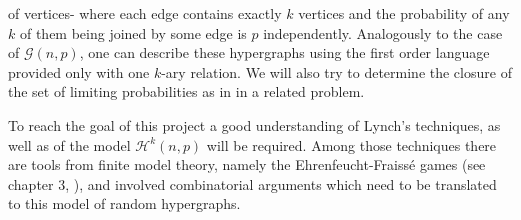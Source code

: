\documentclass{article}
\begin{document}
of vertices- where each edge contains exactly $k$ vertices and the probability of any $k$ of them being joined by some edge is $p$ independently. Analogously to the case of $\mathcal{G}(n,p)$, one can describe these hypergraphs using the first order language provided only with one $k$-ary relation. We will also try to determine the closure of the set of limiting probabilities as in \cite{heinig2018logical} in a related problem.
\par
To reach the goal of this project a good understanding of Lynch's techniques, as well as of the model $\mathcal{H}^k(n,p)$
will be required. Among those techniques there are tools from finite model theory, namely the Ehrenfeucht-Fraissé games 
(see chapter 3, \cite{libkin2013elements}), and involved combinatorial arguments which need to be translated to this model of random hypergraphs. 






\end{document}
